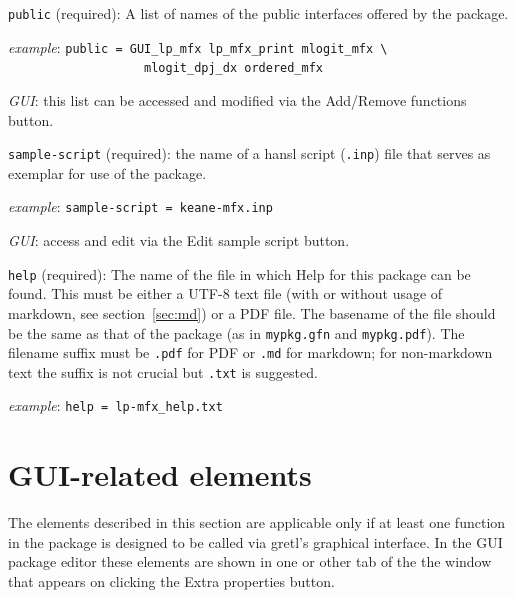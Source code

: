\documentclass[oneside]{book}
\newcommand{\ttusage}[1]{\textit{example}: \quad \texttt{#1}}
\newcommand{\vbusage}[0]{\textit{example}: \quad}
\begin{document}
\begin{description}

\item \texttt{public} (required): A list of names of the public
  interfaces offered by the package.

  \vbusage{} \verb|public = GUI_lp_mfx lp_mfx_print mlogit_mfx \| \\
           \verb|                   mlogit_dpj_dx ordered_mfx |

  \textit{GUI}: this list can be accessed and modified via the
  \textsf{Add/Remove functions} button.

\item \texttt{sample-script} (required): the name of a hansl
   script (\texttt{.inp}) file that serves as exemplar for use
   of the package.

   \ttusage{sample-script = keane-mfx.inp}

   \textit{GUI}: access and edit via the \textsf{Edit sample script}
   button.

 \item \texttt{help} (required): The name of the file in which Help
   for this package can be found. This must be either a UTF-8 text
   file (with or without usage of markdown, see section~\ref{sec:md})
   or a PDF file. The basename of the file should be the same as that
   of the package (as in \texttt{mypkg.gfn} and \texttt{mypkg.pdf}).
   The filename suffix must be \texttt{.pdf} for PDF or \texttt{.md}
   for markdown; for non-markdown text the suffix is not crucial but
   \texttt{.txt} is suggested.

  \vbusage{} \verb|help = lp-mfx_help.txt|

\end{description}

\section{GUI-related elements}
\label{sec:spec-gui}

The elements described in this section are applicable only if at least
one function in the package is designed to be called via gretl's
graphical interface. In the GUI package editor these elements are
shown in one or other tab of the the window that appears on clicking
the \textsf{Extra properties} button.
\end{document}
